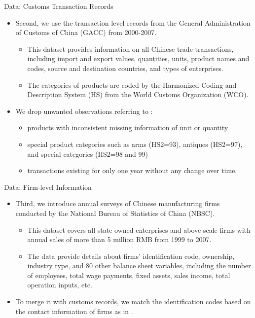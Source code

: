 \documentclass[10pt]{beamer}
\begin{document}
\begin{frame}{Data: Customs Transaction Records}
	\begin{itemize}
		\item Second, we use the transaction level records from the General Administration of Customs of China (GACC) from 2000-2007.
		\begin{itemize}
			\item This dataset provides information on all Chinese trade transactions, including import and export values, quantities, units, product names and codes, source and destination countries, and types of enterprises.
			\item The categories of products are coded by the Harmonized Coding and Description System (HS) from the World Customs Organization (WCO).
		\end{itemize}
		\item We drop unwanted observations referring to \cite{lmx2015}:
		\begin{itemize}
			\item products with inconsistent missing information of unit or quantity
			\item special product categories such as arms (HS2=93), antiques (HS2=97), and special categories (HS2=98 and 99)
			\item transactions existing for only one year without any change over time.
		\end{itemize}
	\end{itemize}
\end{frame}

\begin{frame}{Data: Firm-level Information}
	\begin{itemize}
		\item Third, we introduce annual surveys of Chinese manufacturing firms conducted by the National Bureau of Statistics of China (NBSC).
		\begin{itemize}
			\item This dataset covers all state-owned enterprises and above-scale firms with annual sales of more than 5 million RMB from 1999 to 2007.
			\item The data provide details about firms’ identification code, ownership, industry type, and 80 other balance sheet variables, including the number of employees, total wage payments, fixed assets, sales income, total operation inputs, etc.
		\end{itemize}
		\item To merge it with customs records, we match the identification codes based on the contact information of firms as in \cite{fan-li-yeaple2015}.
	\end{itemize}
\end{frame}
\end{document}
